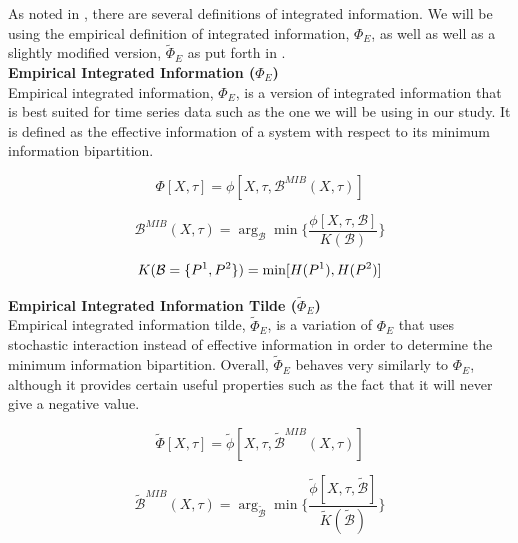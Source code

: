 \documentclass[a4paper,11pt]{article}
\begin{document}
As noted in \cite{Barrett2011}, there are several definitions of integrated information. We will be using the empirical definition of integrated information, $\Phi_{E}$, as well as well as a slightly modified version, $\widetilde{\Phi}_{E}$ as put forth in \cite{Barrett2011}.\\

\noindent\textbf{Empirical Integrated Information ($\Phi_{E}$)}\\[2.5mm]
\noindent Empirical integrated information, $\Phi_{E}$, is a version of integrated information that is best suited for time series data such as the one we will be using in our study. It is defined as the effective information of a system with respect to its minimum information bipartition.

\begin{equation} \label{eq:ii}
\Phi [X, \tau] = \phi [X, \tau, \mathcal{B}^{MIB}(X, \tau)]
\end{equation}

\begin{equation} \label{eq:mib}
\mathcal{B}^{MIB}(X, \tau) = \arg_{\mathcal{B}} \min \Big\lbrace \frac{\phi [X, \tau, \mathcal{B}]}{K(\mathcal{B})} \Big\rbrace
\end{equation}

\begin{equation} \label{eq:norm}
K(\mathcal{B} = \lbrace P^1, P^2 \rbrace) = \min[H(P^1), H(P^2)]\\[2.5mm]
\end{equation}

\noindent\textbf{Empirical Integrated Information Tilde ($\widetilde{\Phi}_{E}$)}\\[2.5mm]
\noindent Empirical integrated information tilde, $\widetilde{\Phi}_{E}$, is a variation of $\Phi_{E}$ that uses stochastic interaction instead of effective information in order to determine the minimum information bipartition. Overall, $\widetilde{\Phi}_{E}$ behaves very similarly to $\Phi_{E}$, although it provides certain useful properties such as the fact that it will never give a negative value.

\begin{equation} \label{eq:ii-tilde}
\widetilde{\Phi} [X, \tau] = \tilde{\phi} [X, \tau, \widetilde{\mathcal{B}}^{MIB}(X, \tau)]
\end{equation}

\begin{equation} \label{eq:mib-tilde}
\widetilde{\mathcal{B}}^{MIB}(X, \tau) = \arg_{\widetilde{\mathcal{B}}} \min \Big\lbrace \frac{\tilde{\phi} [X, \tau, \widetilde{\mathcal{B}}]}{\widetilde{K}(\widetilde{\mathcal{B}})} \Big\rbrace
\end{equation}
\end{document}

